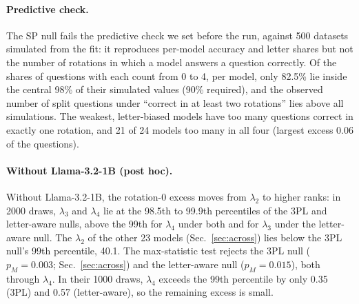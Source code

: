 \documentclass{article}
\theoremstyle{plain}
\theoremstyle{remark}
\begin{document}
\paragraph{Predictive check.} The SP null fails the predictive check we
set before the run, against 500 datasets simulated from the fit: it
reproduces per-model accuracy and letter shares but not the number of
rotations in which a model answers a question correctly. Of the shares
of questions with each count from 0 to 4, per model, only 82.5\% lie
inside the central 98\% of their simulated values (90\% required), and
the observed number of split questions under ``correct in at least two
rotations'' lies above all simulations. The weakest, letter-biased
models have too many questions correct in exactly one rotation, and 21
of 24 models too many in all four (largest excess 0.06 of the
questions).

\paragraph{Without Llama-3.2-1B (post hoc).} Without Llama-3.2-1B, the rotation-0 excess moves from $\lambda_2$ to higher ranks: in 2000
draws, $\lambda_3$ and $\lambda_4$ lie at the 98.5th to 99.9th
percentiles of the 3PL and letter-aware nulls, above the 99th for
$\lambda_4$ under both and for $\lambda_3$ under the letter-aware null. The $\lambda_2$ of the other 23 models (Sec.~\ref{sec:across})
lies below the 3PL null's 99th percentile, 40.1. The max-statistic
test rejects the 3PL null ($p_M=0.003$; Sec.~\ref{sec:across}) and the
letter-aware null ($p_M=0.015$), both through $\lambda_4$. In their 1000 draws, $\lambda_4$ exceeds the
99th percentile by only 0.35 (3PL) and 0.57 (letter-aware), so the
remaining excess is small.
\end{document}
